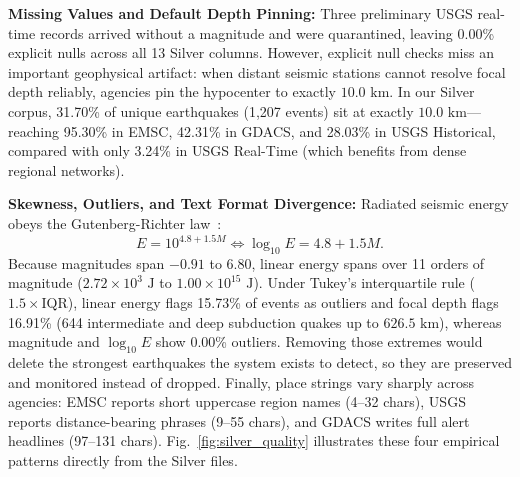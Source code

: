 \textbf{Missing Values and Default Depth Pinning:} Three preliminary USGS real-time records arrived without a magnitude and were quarantined, leaving 0.00\% explicit nulls across all 13 Silver columns. However, explicit null checks miss an important geophysical artifact: when distant seismic stations cannot resolve focal depth reliably, agencies pin the hypocenter to exactly $10.0\text{ km}$. In our Silver corpus, 31.70\% of unique earthquakes (1,207 events) sit at exactly $10.0\text{ km}$---reaching 95.30\% in EMSC, 42.31\% in GDACS, and 28.03\% in USGS Historical, compared with only 3.24\% in USGS Real-Time (which benefits from dense regional networks).

\textbf{Skewness, Outliers, and Text Format Divergence:} Radiated seismic energy obeys the Gutenberg-Richter law~\cite{gutenberg1956}:
\begin{equation}
    E = 10^{4.8 + 1.5M} \iff \log_{10} E = 4.8 + 1.5M.
    \label{eq:gr_energy}
\end{equation}
Because magnitudes span $-0.91$ to $6.80$, linear energy spans over 11 orders of magnitude ($2.72 \times 10^3\text{ J}$ to $1.00 \times 10^{15}\text{ J}$). Under Tukey's interquartile rule ($1.5\times\text{IQR}$), linear energy flags 15.73\% of events as outliers and focal depth flags 16.91\% (644 intermediate and deep subduction quakes up to $626.5\text{ km}$), whereas magnitude and $\log_{10} E$ show 0.00\% outliers. Removing those extremes would delete the strongest earthquakes the system exists to detect, so they are preserved and monitored instead of dropped. Finally, place strings vary sharply across agencies: EMSC reports short uppercase region names (4--32 chars), USGS reports distance-bearing phrases (9--55 chars), and GDACS writes full alert headlines (97--131 chars). Fig.~\ref{fig:silver_quality} illustrates these four empirical patterns directly from the Silver files.

